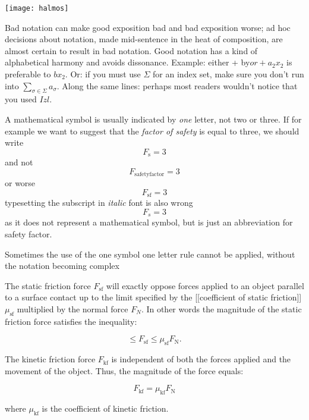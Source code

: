 {\begin{marginfigure}
\texttt{[image: halmos]}
\end{marginfigure}


Bad notation can make good exposition bad and bad exposition worse; ad hoc decisions about notation, made mid-sentence in the heat of composition, are almost certain to result in bad notation. Good notation has a kind of alphabetical harmony and avoids dissonance. Example: either + by$ or +a_2x_2$ is preferable to $bx_2$. Or: if you must use $\Sigma$ for an index set, make sure you don't run into $\sum_{\sigma \in \Sigma}a_\sigma$. Along the same lines: perhaps most readers wouldn't notice that you used $Izl$.


A mathematical symbol is usually indicated by \emph{one} letter, not two or three. If for example we want to suggest that the \textit{factor of safety} is equal to three, we should write
\[F_{\mathrm{s}}=3\]
and not
\[F_{\mathrm{safetyfactor}}=3\]
or worse
\[F_{\mathrm{sf}}=3\]
typesetting the subscript in \textit{italic} font is also wrong
\[F_{s}=3\]
as it does not represent a mathematical symbol, but is just an abbreviation for safety factor.

Sometimes the use of the one symbol one letter rule cannot be applied, without the notation becoming complex
\medskip

{
\narrower\narrower
The static friction force \(F_{\mathrm{sf}}\) will exactly oppose forces applied to an object parallel to a surface contact up to the limit specified by the [[coefficient of static friction]] \(\mu_{\mathrm{sf}}\) multiplied by the normal force \(F_N\). In other words the magnitude of the static friction force satisfies the inequality:

\[ \le F_{\mathrm{sf}} \le \mu_{\mathrm{sf}} F_\mathrm{N}. \]

The kinetic friction force \(F_{\mathrm{kf}}\) is independent of both the forces applied and the movement of the object. Thus, the magnitude of the force equals:

\[F_{\mathrm{kf}} = \mu_{\mathrm{kf}} F_\mathrm{N}\]

where \(\mu_{\mathrm{kf}}\) is the coefficient of kinetic friction.
}




}
